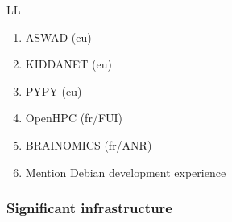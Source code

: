 \begin{sitedescription}{LL}
\begin{enumerate}
\item ASWAD (eu)
\item KIDDANET (eu)
\item PYPY (eu)
\item OpenHPC (fr/FUI)
\item BRAINOMICS (fr/ANR)
\item Mention Debian development experience
\end{enumerate}

\subsubsection*{Significant infrastructure}

\end{sitedescription}

